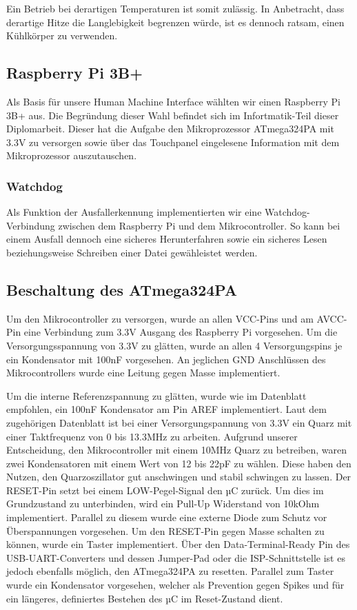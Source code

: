 Ein Betrieb bei derartigen Temperaturen ist somit zulässig.
In Anbetracht, dass derartige Hitze die Langlebigkeit begrenzen würde, ist es dennoch ratsam, einen Kühlkörper zu verwenden.

\subsection{Raspberry Pi 3B+}

Als Basis für unsere Human Machine Interface wählten wir einen Raspberry Pi 3B+ aus.
Die Begründung dieser Wahl befindet sich im Infortmatik-Teil dieser Diplomarbeit.
Dieser hat die Aufgabe den Mikroprozessor ATmega324PA mit 3.3V zu versorgen sowie über das Touchpanel eingelesene Information mit dem Mikroprozessor auszutauschen.

\subsubsection{Watchdog}

Als Funktion der Ausfallerkennung implementierten wir eine Watchdog-Verbindung zwischen dem Raspberry Pi und dem Mikrocontroller.
So kann bei einem Ausfall dennoch eine sicheres Herunterfahren sowie ein sicheres Lesen beziehungsweise Schreiben einer Datei gewähleistet werden.

\subsection{Beschaltung des ATmega324PA}

Um den Mikrocontroller zu versorgen, wurde an allen VCC-Pins und am AVCC-Pin eine Verbindung zum 3.3V Ausgang des Raspberry Pi vorgesehen.
Um die Versorgungsspannung von 3.3V zu glätten, wurde an allen 4 Versorgungspins je ein Kondensator mit 100nF vorgesehen.
An jeglichen GND Anschlüssen des Mikrocontrollers wurde eine Leitung gegen Masse implementiert.

Um die interne Referenzspannung zu glätten, wurde wie im Datenblatt empfohlen, ein 100nF Kondensator am Pin AREF implementiert.
Laut dem zugehörigen Datenblatt ist bei einer Versorgungspannung von 3.3V ein Quarz mit einer Taktfrequenz von 0 bis 13.3MHz zu arbeiten.
Aufgrund unserer Entscheidung, den Mikrocontroller mit einem 10MHz Quarz zu betreiben, waren zwei Kondensatoren mit einem Wert von 12 bis 22pF zu wählen.
Diese haben den Nutzen, den Quarzoszillator gut anschwingen und stabil schwingen zu lassen.
Der RESET-Pin setzt bei einem LOW-Pegel-Signal den µC zurück.
Um dies im Grundzustand zu unterbinden, wird ein Pull-Up Widerstand von 10kOhm implementiert.
Parallel zu diesem wurde eine externe Diode zum Schutz vor Überspannungen vorgesehen.
Um den RESET-Pin gegen Masse schalten zu können, wurde ein Taster implementiert.
Über den Data-Terminal-Ready Pin des USB-UART-Converters und dessen Jumper-Pad oder die ISP-Schnittstelle ist es jedoch ebenfalls möglich, den ATmega324PA zu resetten.
Parallel zum Taster wurde ein Kondensator vorgesehen, welcher als Prevention gegen Spikes und für ein längeres, definiertes Bestehen des µC im Reset-Zustand dient.

